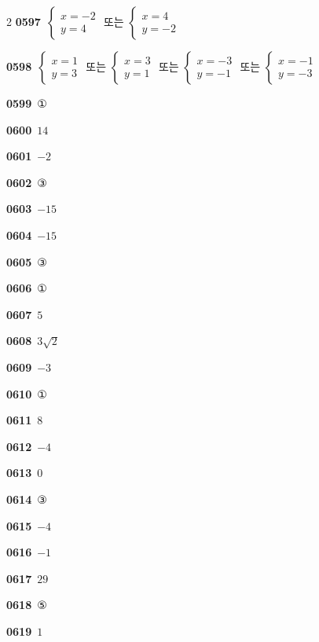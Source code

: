 \documentclass[10pt,a4paper]{article}
\begin{document}
\begin{multicols}{2}
\noindent\textbf{0597}\ $\begin{cases} x=-2 \\ y=4 \end{cases}$ 또는 $\begin{cases} x=4 \\ y=-2 \end{cases}$\par
\noindent\textbf{0598}\ $\begin{cases} x=1 \\ y=3 \end{cases}$ 또는 $\begin{cases} x=3 \\ y=1 \end{cases}$ 또는 $\begin{cases} x=-3 \\ y=-1 \end{cases}$ 또는 $\begin{cases} x=-1 \\ y=-3 \end{cases}$\par
\noindent\textbf{0599}\ ①\par
\noindent\textbf{0600}\ $14$\par
\noindent\textbf{0601}\ $-2$\par
\noindent\textbf{0602}\ ③\par
\noindent\textbf{0603}\ $-15$\par
\noindent\textbf{0604}\ $-15$\par
\noindent\textbf{0605}\ ③\par
\noindent\textbf{0606}\ ①\par
\noindent\textbf{0607}\ $5$\par
\noindent\textbf{0608}\ $3\sqrt{2}$\par
\noindent\textbf{0609}\ $-3$\par
\noindent\textbf{0610}\ ①\par
\noindent\textbf{0611}\ $8$\par
\noindent\textbf{0612}\ $-4$\par
\noindent\textbf{0613}\ $0$\par
\noindent\textbf{0614}\ ③\par
\noindent\textbf{0615}\ $-4$\par
\noindent\textbf{0616}\ $-1$\par
\noindent\textbf{0617}\ $29$\par
\noindent\textbf{0618}\ ⑤\par
\noindent\textbf{0619}\ $1$\par

\end{multicols}
\end{document}
